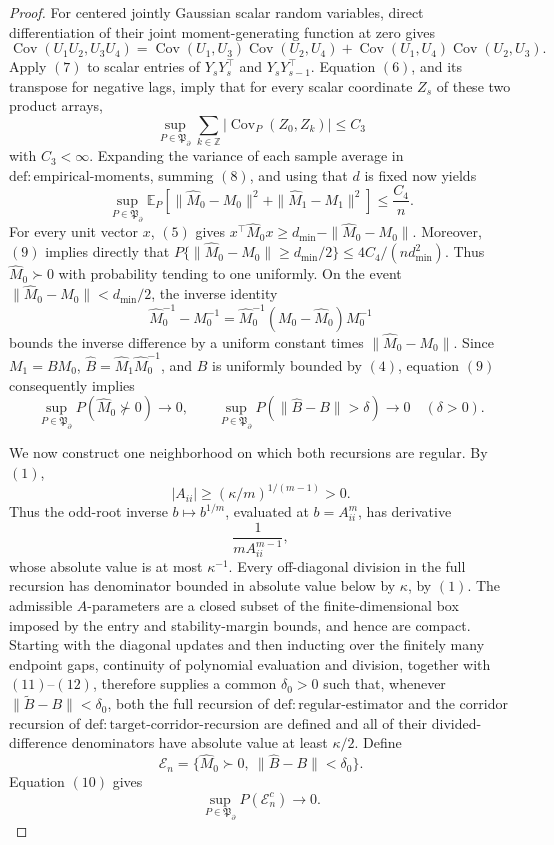 \documentclass{article}
\begin{document}
\begin{proof}
For centered jointly Gaussian scalar random variables, direct
differentiation of their joint moment-generating function at zero gives
\[
 \operatorname{Cov}(U_1U_2,U_3U_4)
 =\operatorname{Cov}(U_1,U_3)\operatorname{Cov}(U_2,U_4)
  +\operatorname{Cov}(U_1,U_4)\operatorname{Cov}(U_2,U_3).
 \tag{7}
\]
Apply \((7)\) to scalar entries of \(Y_sY_s^\top\) and
\(Y_sY_{s-1}^\top\).  Equation \((6)\), and its transpose for negative
lags, imply that for every scalar coordinate \(Z_s\) of these two product
arrays,
\[
 \sup_{P\in\mathfrak P_{\partial}}
 \sum_{k\in\mathbb Z}
 \bigl|\operatorname{Cov}_P(Z_0,Z_k)\bigr|\leq C_3
 \tag{8}
\]
with \(C_3<\infty\).  Expanding the variance of each sample average in
\(\mathrm{def{:}empirical\mbox{-}moments}\), summing \((8)\), and using
that \(d\) is fixed now yields
\[
 \sup_{P\in\mathfrak P_{\partial}}
 \mathbb E_P\!\left[
  \|\widehat M_0-M_0\|^2+
  \|\widehat M_1-M_1\|^2
 \right]\leq\frac{C_4}{n}.
 \tag{9}
\]
For every unit vector \(x\), \((5)\) gives
\(x^\top\widehat M_0x\geq d_{\min}-\|\widehat M_0-M_0\|\).
Moreover, \((9)\) implies directly that
\(P\{\|\widehat M_0-M_0\|\geq d_{\min}/2\}\leq
4C_4/(nd_{\min}^2)\).  Thus \(\widehat M_0\succ0\) with probability
tending to one uniformly.  On the event
\(\|\widehat M_0-M_0\|<d_{\min}/2\), the inverse
identity
\[
 \widehat M_0^{-1}-M_0^{-1}
 =\widehat M_0^{-1}(M_0-\widehat M_0)M_0^{-1}
\]
bounds the inverse difference by a uniform constant times
\(\|\widehat M_0-M_0\|\).  Since
\(M_1=BM_0\), \(\widehat B=\widehat M_1\widehat M_0^{-1}\), and \(B\) is
uniformly bounded by \((4)\), equation \((9)\) consequently implies
\[
 \sup_{P\in\mathfrak P_{\partial}}P(\widehat M_0\not\succ0)
 \longrightarrow0,
 \qquad
 \sup_{P\in\mathfrak P_{\partial}}
 P\!\left(\|\widehat B-B\|>\delta\right)
 \longrightarrow0
 \quad(\delta>0).
 \tag{10}
\]

We now construct one neighborhood on which both recursions are regular.
By \((1)\),
\[
 |A_{ii}|\geq (\kappa/m)^{1/(m-1)}>0.
 \tag{11}
\]
Thus the odd-root inverse \(b\mapsto b^{1/m}\), evaluated at
\(b=A_{ii}^m\), has derivative
\[
 \frac{1}{mA_{ii}^{m-1}},
 \tag{12}
\]
whose absolute value is at most \(\kappa^{-1}\).  Every off-diagonal
division in the full recursion has denominator bounded in absolute value
below by \(\kappa\), by \((1)\).  The admissible \(A\)-parameters are a
closed subset of the finite-dimensional box imposed by the entry and
stability-margin bounds, and hence are compact.  Starting with the
diagonal updates and then inducting over the finitely many endpoint gaps,
continuity of polynomial evaluation and division, together with
\((11)\)--\((12)\), therefore supplies a common \(\delta_0>0\) such that,
whenever \(\|\widetilde B-B\|<\delta_0\), both the full recursion of
\(\mathrm{def{:}regular\mbox{-}estimator}\) and the corridor recursion of
\(\mathrm{def{:}target\mbox{-}corridor\mbox{-}recursion}\) are defined and
all of their divided-difference denominators have absolute value at least
\(\kappa/2\).  Define
\[
 \mathcal E_n
 =\{\widehat M_0\succ0,\ \|\widehat B-B\|<\delta_0\}.
\]
Equation \((10)\) gives
\[
 \sup_{P\in\mathfrak P_{\partial}}P(\mathcal E_n^c)
 \longrightarrow0.
 \tag{13}
\]


\end{proof}
\end{document}
